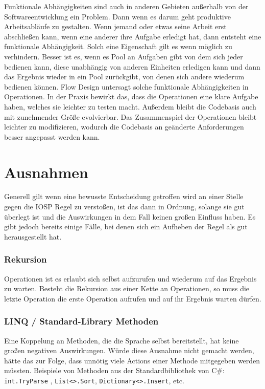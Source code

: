 Funktionale Abhängigkeiten sind auch in anderen Gebieten außerhalb von der
Softwareentwicklung ein Problem. Dann wenn es darum geht produktive
Arbeitsabläufe zu gestalten.
Wenn jemand oder etwas seine Arbeit erst abschließen kann, wenn eine anderer
ihre Aufgabe erledigt hat, dann entsteht eine funktionale Abhängigkeit.
Solch eine Eigenschaft gilt es wenn möglich zu verhindern.
Besser ist es, wenn es Pool an Aufgaben gibt von dem sich jeder bedienen kann,
diese unabhängig von anderen Einheiten erledigen kann und dann das Ergebnis wieder
in ein Pool zurückgibt, von denen sich andere wiederum bedienen können.
Flow Design untersagt solche funktionale Abhängigkeiten in Operationen.
In der Praxis bewirkt das, dass die Operationen eine klare Aufgabe haben, welches
sie leichter zu testen macht.
Außerdem bleibt die Codebasis auch mit zunehmender Größe evolvierbar. Das
Zusammenspiel der Operationen bleibt leichter zu modifizieren, wodurch die
Codebasis an geänderte Anforderungen besser angepasst werden kann.

\section{Ausnahmen}

Generell gilt  wenn eine bewusste Entscheidung getroffen wird an einer Stelle gegen die IOSP
Regel zu verstoßen, ist das dann in Ordnung, solange sie gut überlegt ist und
die Auswirkungen in dem Fall keinen großen Einfluss haben.
Es gibt jedoch bereits einige Fälle, bei denen sich ein Aufheben der Regel als gut
herausgestellt hat.
\subsubsection{Rekursion}

Operationen ist es erlaubt sich selbst aufzurufen und wiederum auf das Ergebnis
zu warten. Besteht die Rekursion aus einer Kette an Operationen, so muss die letzte
Operation die erste Operation aufrufen und auf ihr Ergebnis warten dürfen.
\subsubsection{LINQ / Standard-Library Methoden}

Eine Koppelung an Methoden, die die Sprache selbst bereitstellt, hat keine
großen negativen Auswirkungen. Würde diese Ausnahme nicht gemacht werden, hätte
das zur Folge, dass unnötig viele Actions einer Methode mitgegeben werden
müssten. Beispiele von Methoden aus der Standardbibliothek von C\#:
\texttt{int.TryParse} , \texttt{List<>.Sort}, \texttt{Dictionary<>.Insert}, etc.


